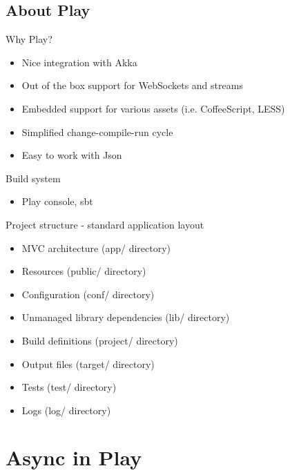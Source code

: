 \documentclass{beamer}
\begin{document}
	\subsection{About Play}
		\begin{frame}
			\begin{block}{Why Play?}
				\begin{itemize}
					\item Nice integration with Akka
					\pause \item Out of the box support for WebSockets and streams
					\pause \item Embedded support for various assets (i.e. CoffeeScript, LESS)
					\pause \item Simplified change-compile-run cycle
					\pause \item Easy to work with Json
				\end{itemize}
			\end{block}
		\end{frame}
		\begin{frame}
			\begin{block}{Build system}
				\begin{itemize}
					\item Play console, sbt
				\end{itemize}
			\end{block}
			\begin{block}{Project structure - standard application layout}
				\begin{itemize}
					\pause \item MVC architecture (app/ directory)
					\pause \item Resources (public/ directory)
					\pause \item Configuration (conf/ directory)
					\pause \item Unmanaged library dependencies (lib/ directory)
					\pause \item Build definitions (project/ directory)
					\pause \item Output files (target/ directory)
					\pause \item Tests (test/ directory)
					\pause \item Logs (log/ directory)
				\end{itemize}
			\end{block}
		\end{frame}

\section{Async in Play}
\end{document}
